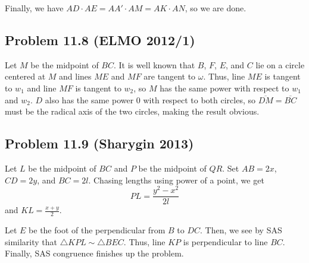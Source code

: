 \documentclass{scrartcl}
\begin{document}
Finally, we have $AD \cdot AE = AA' \cdot AM = AK \cdot AN$, so we are done.

\subsection*{Problem 11.8 (ELMO 2012/1)}
Let $M$ be the midpoint of $BC$. It is well known that $B$, $F$, $E$, and $C$ lie on a circle centered at $M$ and lines $ME$ and $MF$ are tangent to $\omega$. Thus, line $ME$ is tangent to $w_1$ and line $MF$ is tangent to $w_2$, so $M$ has the same power with respect to $w_1$ and $w_2$. $D$ also has the same power $0$ with respect to both circles, so $\overline{DM} = \overline{BC}$ must be the radical axis of the two circles, making the result obvious.

\subsection*{Problem 11.9 (Sharygin 2013)}
Let $L$ be the midpoint of $BC$ and $P$ be the midpoint of $QR$. Set $AB = 2x$, $CD = 2y$, and $BC = 2l$. Chasing lengths using power of a point, we get
\[ PL = \frac{y^2-x^2}{2l} \]
and $KL = \frac{x+y}{2}$.

Let $E$ be the foot of the perpendicular from $B$ to $DC$. Then, we see by SAS similarity that $\triangle KPL \sim \triangle BEC$. Thus, line $KP$ is perpendicular to line $BC$. Finally, SAS congruence finishes up the problem.
\end{document}
